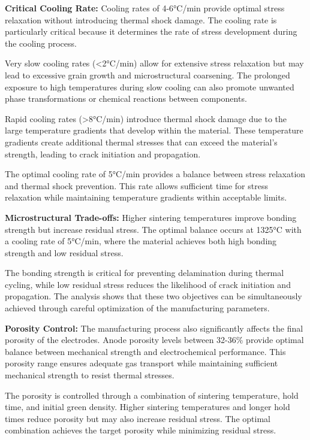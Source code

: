 \documentclass[conference]{IEEEtran}
\begin{document}
\textbf{Critical Cooling Rate:} Cooling rates of 4-6°C/min provide optimal stress relaxation without introducing thermal shock damage. The cooling rate is particularly critical because it determines the rate of stress development during the cooling process.

Very slow cooling rates (<2°C/min) allow for extensive stress relaxation but may lead to excessive grain growth and microstructural coarsening. The prolonged exposure to high temperatures during slow cooling can also promote unwanted phase transformations or chemical reactions between components.

Rapid cooling rates (>8°C/min) introduce thermal shock damage due to the large temperature gradients that develop within the material. These temperature gradients create additional thermal stresses that can exceed the material's strength, leading to crack initiation and propagation.

The optimal cooling rate of 5°C/min provides a balance between stress relaxation and thermal shock prevention. This rate allows sufficient time for stress relaxation while maintaining temperature gradients within acceptable limits.

\textbf{Microstructural Trade-offs:} Higher sintering temperatures improve bonding strength but increase residual stress. The optimal balance occurs at 1325°C with a cooling rate of 5°C/min, where the material achieves both high bonding strength and low residual stress.

The bonding strength is critical for preventing delamination during thermal cycling, while low residual stress reduces the likelihood of crack initiation and propagation. The analysis shows that these two objectives can be simultaneously achieved through careful optimization of the manufacturing parameters.

\textbf{Porosity Control:} The manufacturing process also significantly affects the final porosity of the electrodes. Anode porosity levels between 32-36\% provide optimal balance between mechanical strength and electrochemical performance. This porosity range ensures adequate gas transport while maintaining sufficient mechanical strength to resist thermal stresses.

The porosity is controlled through a combination of sintering temperature, hold time, and initial green density. Higher sintering temperatures and longer hold times reduce porosity but may also increase residual stress. The optimal combination achieves the target porosity while minimizing residual stress.
\end{document}
